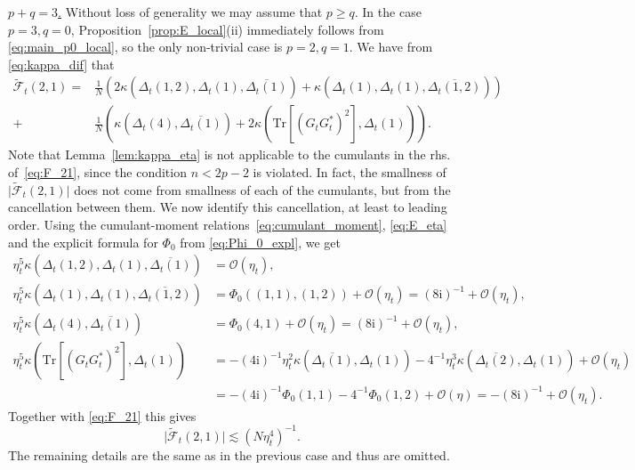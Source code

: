 \documentclass[10pt]{amsart}
\numberwithin{equation}{section}
\newcommand{\Tr}{\mathrm{Tr}}
\newcommand{\ii}{\mathrm{i}}
\begin{document}
\smallskip

\noindent\underline{$p+q=3$.} Without loss of generality we may assume that $p\ge q$. In the case $p=3,q=0$, Proposition~\ref{prop:E_local}(ii) immediately follows from \eqref{eq:main_p0_local}, so the only non-trivial case is $p=2,q=1$. We have from \eqref{eq:kappa_dif} that
\begin{equation}
\begin{split}
\widetilde{\mathcal{\mathcal{F}}}_t(2,1) = &\frac{1}{N}\left( 2\kappa\left(\Delta_t(1,2),\Delta_t(1),\overline{\Delta_t(1)}\right) + \kappa\left(\Delta_t(1),\Delta_t(1),\overline{\Delta_t(1,2)}\right)\right)\\
+&\frac{1}{N}\left( \kappa\left(\Delta_t(4),\overline{\Delta_t(1)}\right) + 2\kappa\left(\Tr \left[(G_tG^*_t)^2\right],\Delta_t(1)\right)\right).
\end{split}
\label{eq:F_21}
\end{equation}
Note that Lemma~\ref{lem:kappa_eta} is not applicable to the cumulants in the rhs. of~\eqref{eq:F_21},  since the condition $n<2p-2$ is violated. In fact, the smallness of $\big|\widetilde{\mathcal{\mathcal{F}}}_t(2,1)\big|$ does not come from smallness of each of the cumulants, but from the cancellation between them. We now identify this cancellation, at least to leading order. Using the cumulant-moment relations~\eqref{eq:cumulant_moment},  \eqref{eq:E_eta} and the explicit formula for $\Phi_0$ from \eqref{eq:Phi_0_expl}, we get
\begin{equation}
\begin{split}
\eta_t^5\kappa\left(\Delta_t(1,2),\Delta_t(1),\overline{\Delta_t(1)}\right) &= \mathcal{O}(\eta_t),\\
\eta_t^5\kappa\left(\Delta_t(1),\Delta_t(1),\overline{\Delta_t(1,2)}\right)&= \Phi_0\left((1,1),(1,2)\right) +\mathcal{O}(\eta_t) = (8\ii)^{-1} +\mathcal{O}(\eta_t),\\
\eta_t^5\kappa\left(\Delta_t(4),\overline{\Delta_t(1)}\right)&= \Phi_0(4,1)+\mathcal{O}(\eta_t) =(8\ii)^{-1}+\mathcal{O}(\eta_t),\\
\eta_t^5\kappa\left(\Tr \left[(G_tG^*_t)^2\right],\Delta_t(1)\right)&= -(4\ii)^{-1}\eta_t^2\kappa\left(\overline{\Delta_t(1)},\Delta_t(1)\right) -4^{-1}\eta_t^3\kappa\left(\overline{\Delta_t(2)},\Delta_t(1)\right) +\mathcal{O}(\eta_t)\\
&= -(4\ii)^{-1}\Phi_0(1,1) -4^{-1}\Phi_0(1,2) +\mathcal{O}(\eta) = -(8\ii)^{-1}+\mathcal{O}(\eta_t).
\end{split}
\end{equation}
Together with \eqref{eq:F_21} this gives
\begin{equation}
\big|\widetilde{\mathcal{\mathcal{F}}}_t(2,1)\big|\lesssim (N\eta_t^4)^{-1}.
\end{equation}
The remaining details are the same as in the previous case and thus are omitted.
\end{document}
